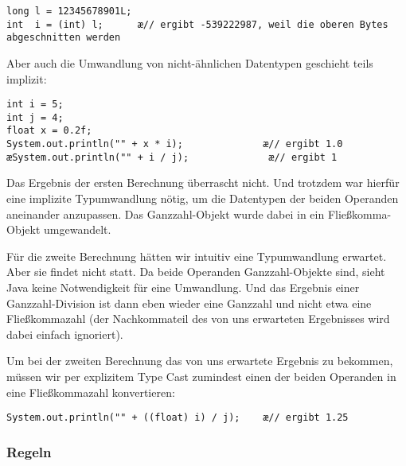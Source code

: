 \begin{lstlisting}
long l = 12345678901L;
int  i = (int) l;      æ// ergibt -539222987, weil die oberen Bytes abgeschnitten werden
\end{lstlisting}

\pagebreak

Aber auch die Umwandlung von nicht-ähnlichen Datentypen geschieht teils
implizit:

\begin{lstlisting}
int i = 5;
int j = 4;
float x = 0.2f;
System.out.println("" + x * i);              æ// ergibt 1.0
æSystem.out.println("" + i / j);              æ// ergibt 1
\end{lstlisting}

Das Ergebnis der ersten Berechnung überrascht nicht. Und trotzdem war hierfür
eine implizite Typumwandlung nötig, um die Datentypen der beiden Operanden
aneinander anzupassen. Das Ganzzahl-Objekt wurde dabei in ein Fließkomma-Objekt
umgewandelt.

Für die zweite Berechnung hätten wir intuitiv eine Typumwandlung erwartet. Aber
sie findet nicht statt. Da beide Operanden Ganzzahl-Objekte sind, sieht Java
keine Notwendigkeit für eine Umwandlung. Und das Ergebnis einer
Ganzzahl-Division ist dann eben wieder eine Ganzzahl und nicht etwa eine
Fließkommazahl (der Nachkommateil des von uns erwarteten Ergebnisses wird dabei
einfach ignoriert).

Um bei der zweiten Berechnung das von uns erwartete Ergebnis zu bekommen, müssen
wir per explizitem Type Cast zumindest einen der beiden Operanden in eine
Fließkommazahl konvertieren:

\begin{lstlisting}
System.out.println("" + ((float) i) / j);    æ// ergibt 1.25
\end{lstlisting}

\subsubsection{Regeln}

